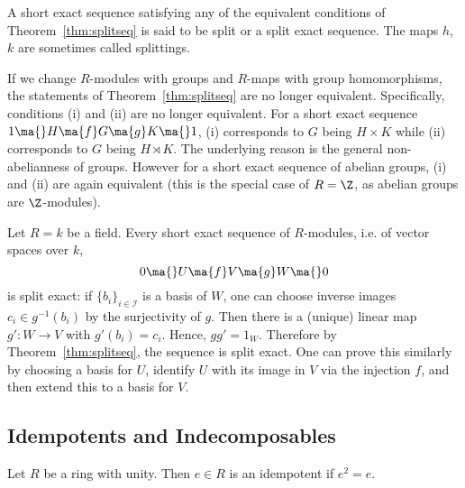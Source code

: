 \begin{dfn}
A short exact sequence satisfying any of the equivalent conditions of Theorem~\ref{thm:splitseq} is said to be split or a split exact sequence. The maps $h$, $k$ are sometimes called splittings.
\end{dfn}


\begin{rem}
If we change $R$-modules with groups and $R$-maps with group homomorphisms, the statements of Theorem~\ref{thm:splitseq} are no longer equivalent. Specifically, conditions (i) and (ii) are no longer equivalent. For a short exact sequence $1 \ma{} H \ma{f} G \ma{g} K \ma{} 1$, (i) corresponds to $G$ being $H \times K$ while (ii) corresponds to $G$ being $H \rtimes K$. The underlying reason is the general non-abelianness of groups. However for a short exact sequence of abelian groups, (i) and (ii) are again equivalent (this is the special case of $R=\Z$, as abelian groups are $\Z$-modules). 
\end{rem}


\begin{ex}
Let $R=k$ be a field. Every short exact sequence of $R$-modules, i.e. of vector spaces over $k$, 
	\[
	0 \ma{} U \ma{f} V \ma{g} W \ma{} 0
	\]
is split exact: if $\{b_i\}_{i \in \mathcal{I}}$ is a basis of $W$, one can choose inverse images $c_i \in g^{-1}(b_i)$ by the surjectivity of $g$. Then there is a (unique) linear map $g': W \to V$ with $g'(b_i)=c_i$. Hence, $gg'=1_W$. Therefore by Theorem~\ref{thm:splitseq}, the sequence is split exact. One can prove this similarly by choosing a basis for $U$, identify $U$ with its image in $V$ via the injection $f$, and then extend this to a basis for $V$. \xqed
\end{ex}



\subsection{Idempotents and Indecomposables}


\begin{dfn}[Idempotent]
Let $R$ be a ring with unity. Then $e \in R$ is an idempotent if $e^2=e$. 
\end{dfn}


